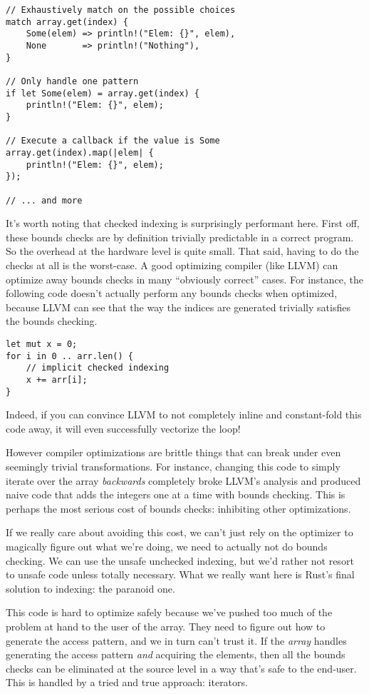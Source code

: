 \begin{verbatim}
// Exhaustively match on the possible choices
match array.get(index) {
    Some(elem) => println!("Elem: {}", elem),
    None       => println!("Nothing"),
}

// Only handle one pattern
if let Some(elem) = array.get(index) {
    println!("Elem: {}", elem);
}

// Execute a callback if the value is Some
array.get(index).map(|elem| {
    println!("Elem: {}", elem);
});

// ... and more
\end{verbatim}

It's worth noting that checked indexing is surprisingly performant here.
First off, these bounds checks are by definition trivially predictable in a
correct program. So the overhead at the hardware level is quite small. That said,
having to do the checks at all is the worst-case. A good optimizing compiler
(like LLVM) can optimize away bounds checks in many ``obviously correct'' cases.
For instance, the following code doesn't actually perform any bounds checks
when optimized, because LLVM can see that the way the indices are generated
trivially satisfies the bounds checking.

\begin{verbatim}
let mut x = 0;
for i in 0 .. arr.len() {
    // implicit checked indexing
    x += arr[i];
}
\end{verbatim}

Indeed, if you can convince LLVM to not completely inline and constant-fold
this code away, it will even successfully vectorize the loop!

However compiler optimizations are brittle things that can break under even
seemingly trivial transformations. For instance, changing this code to simply
iterate over the array \emph{backwards} completely broke LLVM's analysis and produced
naive code that adds the integers one at a time with bounds checking. This is
perhaps the most serious cost of bounds checks: inhibiting other optimizations.

If we really care about avoiding this cost, we can't just rely on the optimizer
to magically figure out what we're doing, we need to actually not do bounds
checking. We can use the unsafe unchecked indexing, but we'd rather not resort
to unsafe code unless totally necessary. What we really want here is Rust's final
solution to indexing: the paranoid one.

This code is hard to optimize safely
because we've pushed too much of the problem at hand to the user of the array.
They need to figure out how to generate the access pattern, and we in turn can't
trust it. If the \emph{array} handles generating the access pattern \emph{and}
acquiring the elements, then all the bounds checks can be eliminated at the
source level in a way that's safe to the end-user. This is handled by a tried
and true approach: iterators.

